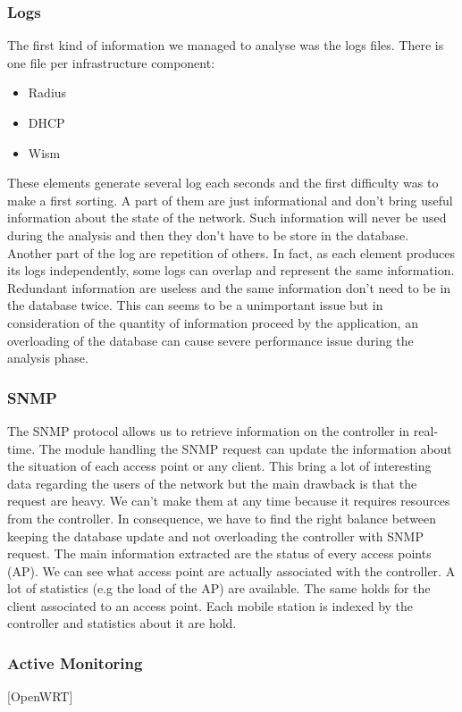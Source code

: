 \subsubsection{Logs}
The first kind of information we managed to analyse was the logs files. There is one file per infrastructure component:
\begin{itemize}
\item Radius
\item DHCP
\item Wism
\end{itemize}
These elements generate several log each seconds and the first difficulty was to make a first sorting. A part of them are just informational and don't bring useful information about the state of the network. Such information will never be used during the analysis and then they don't have to be store in the database. Another part of the log are repetition of others. In fact, as each element produces its logs independently, some logs can overlap and represent the same information. Redundant information are useless and the same information don't need to be in the database twice. This can seems to be a unimportant issue but in consideration of the quantity of information proceed by the application, an overloading of the database can cause severe performance issue during the analysis phase.

\subsubsection{SNMP}
The SNMP protocol allows us to retrieve information on the controller in real-time. The module handling the SNMP request can update the information about the situation of each access point or any client. This bring a lot of interesting data regarding the users of the network but the main drawback is that the request are heavy. We can't make them at any time because it requires resources from the controller. In consequence, we have to find the right balance between keeping the database update and not overloading the controller with SNMP request.
The main information extracted are the status of every access points (AP). We can see what access point are actually associated with the controller. A lot of statistics (e.g the load of the AP) are available.
The same holds for the client associated to an access point. Each mobile station is indexed by the controller and statistics about it are hold.

\subsubsection{Active Monitoring}
[OpenWRT]

